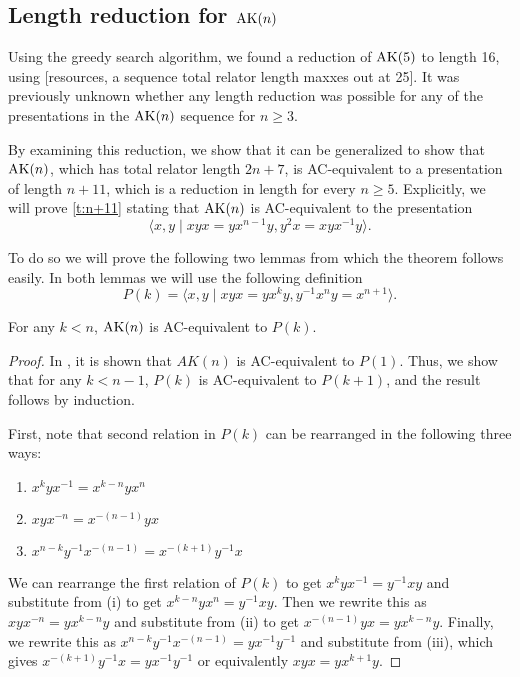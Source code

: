 
\subsection{Length reduction for $\text{AK}(n)$}

Using the greedy search algorithm, we found a reduction of $\text{AK}(5)$ to length 16, using [resources, a sequence total relator length maxxes out at 25].
It was previously unknown whether any length reduction was possible for any of the presentations in the $\text{AK}(n)$ sequence for $n \geq 3$.

By examining this reduction, we show that it can be generalized to show that $\text{AK}(n)$, which has total relator length $2n+7$, is AC-equivalent to a presentation of length $n+11$, which is a reduction in length for every $n \geq 5$.
Explicitly, we will prove \autoref{t:n+11} stating that $\text{AK}(n)$ is AC-equivalent to the presentation
\[
\langle x,y \mid xyx=yx^{n-1}y, y^2x=xyx^{-1}y \rangle.
\]

To do so we will prove the following two lemmas from which the theorem follows easily.
In both lemmas we will use the following definition
\[
P(k) = \langle x,y \mid xyx=yx^k y, y^{-1}x^n y = x^{n+1}\rangle.
\]

\begin{lemma}
    For any $k<n$, $\text{AK}(n)$ is AC-equivalent to $P(k)$.
\end{lemma}

\begin{proof}
    In \cite{MMS}, it is shown that $AK(n)$ is AC-equivalent to $P(1)$. Thus, we show that for any $k<n-1$, $P(k)$ is AC-equivalent to $P(k+1)$, and the result follows by induction.

    First, note that second relation in $P(k)$ can be rearranged in the following three ways:
    \begin{enumerate}[label=(\roman*)]
        \item $x^kyx^{-1}=x^{k-n}yx^n$
        \item $xyx^{-n}=x^{-(n-1)}yx$
        \item $x^{n-k}y^{-1}x^{-(n-1)}=x^{-(k+1)}y^{-1}x$
    \end{enumerate}

    We can rearrange the first relation of $P(k)$ to get $x^k y x^{-1}=y^{-1}xy$ and substitute from (i) to get $x^{k-n} y x^n = y^{-1}xy$. Then we rewrite this as $xyx^{-n}=yx^{k-n}y$ and substitute from (ii) to get $ x^{-(n-1)}yx= yx^{k-n}y$. Finally, we rewrite this as $x^{n-k}y^{-1}x^{-(n-1)}=yx^{-1}y^{-1}$ and substitute from (iii), which gives $x^{-(k+1)}y^{-1}x=yx^{-1}y^{-1}$ or equivalently $xyx=yx^{k+1}y$.
\end{proof}

